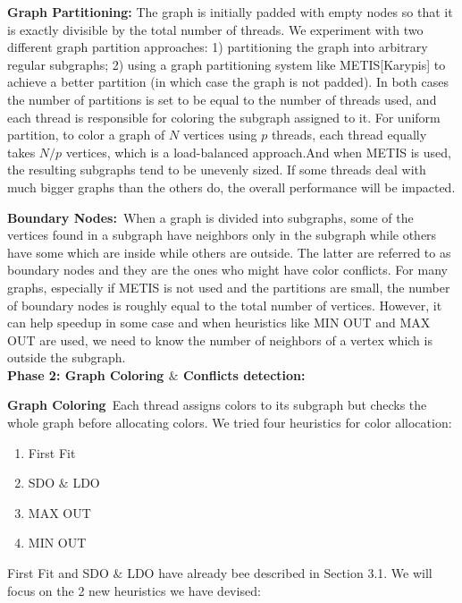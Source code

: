 \documentclass[preprint]{sigplanconf}
\begin{document}
\textbf{Graph Partitioning:}
The graph is initially padded with empty nodes so that it is exactly divisible by the total number of threads. We experiment with two different graph partition approaches: 1) partitioning the graph into arbitrary regular subgraphs; 2) using a graph partitioning system like METIS[Karypis] to achieve a better partition (in which case the graph is not padded). In both cases the number of partitions is set to be equal to the number of threads used, and each thread is responsible for coloring the subgraph assigned to it. 
For uniform partition, to color a graph of $N$ vertices using $p$ threads, each thread equally takes $N/p$ vertices, which is a load-balanced approach.And when METIS is used, the resulting subgraphs tend to be unevenly sized. If some threads deal with much bigger graphs than the others do, the overall performance will be impacted.


\textbf{Boundary Nodes:}\
When a graph is divided into subgraphs, some of the vertices found in a subgraph have neighbors only in the subgraph while others have some which are inside while others are outside. The latter are referred to as boundary nodes and they are the ones who might have color conflicts. For many graphs, especially if METIS is not used and the partitions are small, the number of boundary nodes is roughly equal to the total number of vertices. However, it can help speedup in some case and when heuristics like MIN OUT and MAX OUT are used, we need to know the number of neighbors of a vertex which is outside the subgraph.\\

\textbf{Phase 2: Graph Coloring $\&$ Conflicts detection:}\

\textbf{Graph Coloring}\
Each thread assigns colors to its subgraph but checks the whole graph before allocating colors. We tried four heuristics for color allocation:
\renewcommand{\labelenumi}{\roman{enumi}) } 
\begin{enumerate}
  \item First Fit
  \item SDO $\&$ LDO
  \item MAX OUT
  \item MIN OUT
\end{enumerate}

First Fit and SDO $\&$ LDO have already bee described in Section 3.1. We will focus on the 2 new heuristics we have devised:\\
\end{document}
